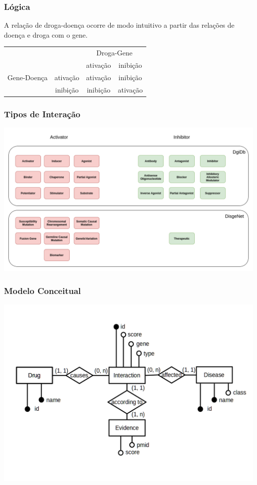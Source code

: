 \documentclass[12pt]{beamer}
\begin{document}
\begin{frame}[fragile]
  \frametitle{Lógica}

  A relação de droga-doença ocorre de modo intuitivo a partir das relações de
  doença e droga com o gene.

  \vspace*{0.1cm}

  \begin{tabular}{| c c | c c |}
    \hline
    & & \multicolumn{2}{c|}{Droga-Gene} \\
    & & ativação & inibição \\
    \hline
    Gene-Doença & ativação & ativação & inibição \\
    & inibição & inibição & ativação \\
    \hline
  \end{tabular}

\end{frame}

\begin{frame}[fragile]
  \frametitle{Tipos de Interação}

  \centering
  \includegraphics[scale=0.29]{diagram.png}
\end{frame}



\begin{frame}[fragile]
  \frametitle{Modelo Conceitual}
  \centering
  \includegraphics[scale=0.275]{conceitual.png}
\end{frame}
\end{document}
